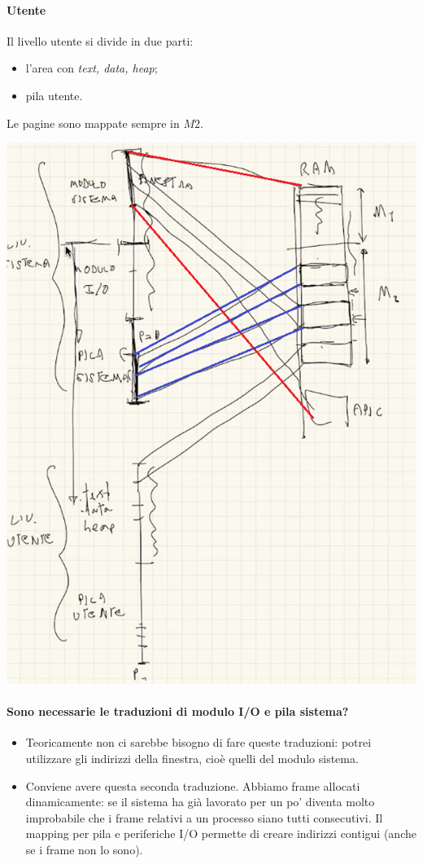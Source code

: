 \paragraph{Utente}
Il livello utente si divide in due parti:
\begin{itemize}
	\item l'area con \emph{text, data, heap};
	\item pila utente.
\end{itemize}
Le pagine sono mappate sempre in $M2$.
\begin{center}
	\includegraphics[scale=.6]{img/245.PNG}
\end{center}
\paragraph{Sono necessarie le traduzioni di modulo I/O e pila sistema?} 
\begin{itemize}
	\item Teoricamente non ci sarebbe bisogno di fare queste traduzioni: potrei utilizzare gli indirizzi della finestra, cioè quelli del modulo sistema.
	\item Conviene avere questa seconda traduzione. Abbiamo frame allocati dinamicamente: se il sistema ha già lavorato per un po' diventa molto improbabile che i frame relativi a un processo siano tutti consecutivi. Il mapping per pila e periferiche I/O permette di creare indirizzi contigui (anche se i frame non lo sono). 
\end{itemize} 






